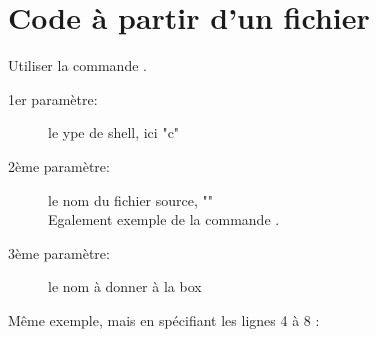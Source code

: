 \section{Code à partir d'un fichier}

Utiliser la commande .
\begin{description}
 \item[1er paramètre:] le ype de shell, ici "c"
 \item[2ème paramètre:] le nom du fichier source, ""\\ Egalement exemple de la commande .
 \item[3ème paramètre:] le nom à donner à la box
\end{description}



Même exemple, mais en spécifiant les lignes 4 à 8 :



